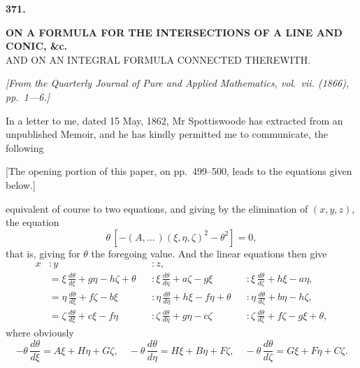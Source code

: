 \documentclass[11pt,a4paper]{article}
\begin{document}

\begin{center}
\textbf{371.}
\end{center}
\vspace{-8pt}

\begin{center}
\textbf{ON A FORMULA FOR THE INTERSECTIONS OF A LINE AND CONIC, \&c.}\\[6pt]
\small AND ON AN INTEGRAL FORMULA CONNECTED THEREWITH.
\end{center}

\begin{flushright}
\small\textit{[From the Quarterly Journal of Pure and Applied Mathematics, vol.~vii. (1866), pp.~1---6.]}
\end{flushright}

\vspace{6pt}

\noindent
In a letter to me, dated 15 May, 1862, Mr Spottiswoode has extracted from an unpublished Memoir, and he has kindly permitted me to communicate, the following

[The opening portion of this paper, on pp.~499--500, leads to the equations given below.]

equivalent of course to two equations, and giving by the elimination of $(x, y, z)$, the equation
\[
\theta\,[-(A, \ldots \,)(\xi, \eta, \zeta)^{2} - \theta^{2}] = 0,
\]
that is, giving for $\theta$ the foregoing value. And the linear equations then give
\begin{align*}
x &: y &&: z,\\
&= \xi\,\frac{d\theta}{d\xi} + g\eta - h\zeta + \theta &&: \xi\,\frac{d\theta}{d\eta} + a\zeta - g\xi &&: \xi\,\frac{d\theta}{d\zeta} + h\xi - a\eta,\\
&= \eta\,\frac{d\theta}{d\xi} + f\zeta - b\xi &&: \eta\,\frac{d\theta}{d\eta} + h\xi - f\eta + \theta &&: \eta\,\frac{d\theta}{d\zeta} + b\eta - h\zeta,\\
&= \zeta\,\frac{d\theta}{d\xi} + c\xi - f\eta &&: \zeta\,\frac{d\theta}{d\eta} + g\eta - c\zeta &&: \zeta\,\frac{d\theta}{d\zeta} + f\zeta - g\xi + \theta,
\end{align*}
where obviously
\[
-\theta\,\frac{d\theta}{d\xi} = A\xi + H\eta + G\zeta,\quad
-\theta\,\frac{d\theta}{d\eta} = H\xi + B\eta + F\zeta,\quad
-\theta\,\frac{d\theta}{d\zeta} = G\xi + F\eta + C\zeta.
\]
\end{document}
